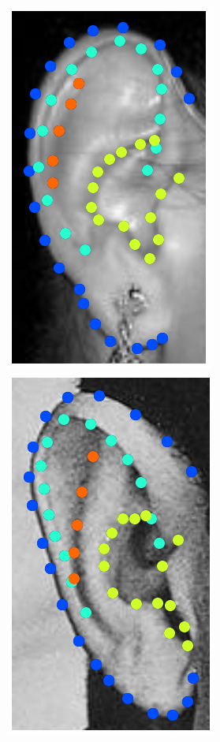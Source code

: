 \begin{figure}
    \includegraphics[height=\flowh]{resources/Ear_Deformable_Model/dbs/db_2}
    \hfill
    \includegraphics[height=\flowh]{resources/Ear_Deformable_Model/dbs/db_3}
    \hfill

\end{figure}
